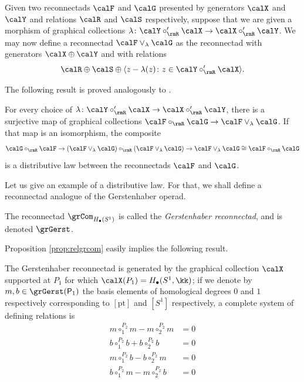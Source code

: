 Given two reconnectads $\calF$ and $\calG$ presented by generators $\calX$ and $\calY$ and relations $\calR$ and $\calS$ respectively, suppose that we are given a morphism of graphical collections $\lambda\colon \calY \circ'_{\rmR} \calX \rightarrow \calX\circ'_{\rmR}\calY$. We may now define a reconnectad $\calF\vee_{\lambda}\calG$ as the reconnectad with generators $\calX\oplus\calY$ and with relations
 \[
\calR\oplus\calS\oplus\langle z-\lambda(z)\colon z\in \calY \circ'_{\rmR} \calX\rangle.
 \]

The following result is proved analogously to \cite[Prop.~8.6.4]{MR2954392}.

\begin{prop}
For every choice of $\lambda\colon \calY \circ'_{\rmR} \calX \rightarrow \calX\circ'_{\rmR}\calY$, there is a surjective map of graphical collections $\calF\circ_{\rmR}\calG\to \calF\vee_{\lambda}\calG$. If that map is an isomorphism, the composite
\[
\calG\circ_{\rmR} \calF \rightarrow (\calF\vee_{\lambda}\calG)\circ_{\rmR} (\calF\vee_{\lambda}\calG)\to \calF\vee_{\lambda}\calG \cong\calF\circ_{\rmR} \calG
\]
is a distributive law between the reconnectads $\calF$ and $\calG$.
\end{prop}

Let us give an example of a distributive law. For that, we shall define a reconnectad analogue of the Gerstenhaber operad.

\begin{defi}
The reconnectad $\grCom_{H_\bullet(S^1)}$ is called the \emph{Gerstenhaber reconnectad}, and is denoted $\grGerst$.
\end{defi}

Proposition \ref{prop:relgrcom} easily implies the following result.

\begin{prop}\label{prop:relgerst}
The Gerstenhaber reconnectad is generated by the graphical collection $\calX$ supported at $P_1$ for which $\calX(P_1)=H_\bullet(S^1,\kk)$; if we denote by $m,b\in \grGerst(\mathsf{P}_1)$ the basis elements of homological degrees $0$ and $1$ respectively corresponding to $[\mathrm{pt}]$ and $[S^1]$ respectively, a complete system of defining relations is
\begin{align}
m\circ_{1}^{P_2} m - m\circ_{2}^{P_2} m &= 0\\
b\circ_{1}^{P_2} b + b\circ_{2}^{P_2} b &= 0\\
m\circ_{1}^{P_2} b - b\circ_{2}^{P_2} m &= 0\\
b\circ_{1}^{P_2} m - m\circ_{2}^{P_2} b &= 0
\end{align}
\end{prop}

